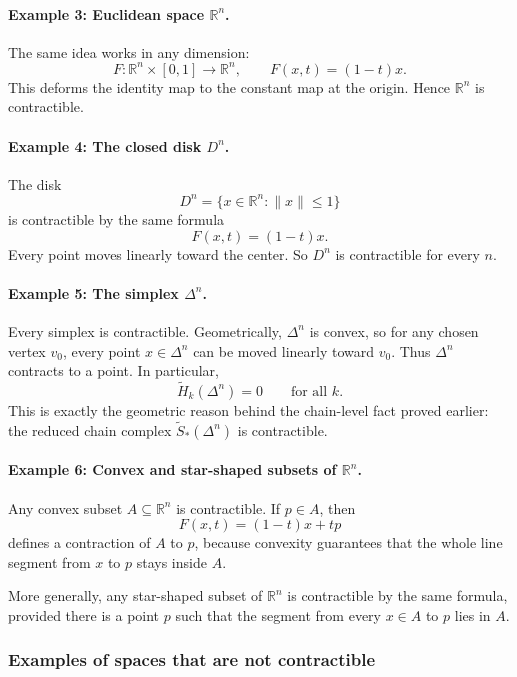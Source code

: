\documentclass[12pt,a4paper]{article}
\theoremstyle{notespace}
\begin{document}
\paragraph{Example 3: Euclidean space \(\mathbb{R}^n\).}
The same idea works in any dimension:
\[
F:\mathbb{R}^n\times [0,1]\to \mathbb{R}^n, \qquad F(x,t)=(1-t)x.
\]
This deforms the identity map to the constant map at the origin. Hence \(\mathbb{R}^n\) is contractible.

\paragraph{Example 4: The closed disk \(D^n\).}
The disk
\[
D^n=\{x\in \mathbb{R}^n : \|x\|\le 1\}
\]
is contractible by the same formula
\[
F(x,t)=(1-t)x.
\]
Every point moves linearly toward the center. So \(D^n\) is contractible for every \(n\).

\paragraph{Example 5: The simplex \(\Delta^n\).}
Every simplex is contractible. Geometrically, \(\Delta^n\) is convex, so for any chosen vertex \(v_0\), every point \(x\in \Delta^n\) can be moved linearly toward \(v_0\). Thus \(\Delta^n\) contracts to a point. In particular,
\[
\widetilde{H}_k(\Delta^n)=0 \qquad \text{for all } k.
\]
This is exactly the geometric reason behind the chain-level fact proved earlier: the reduced chain complex \(\widetilde{S}_*(\Delta^n)\) is contractible.

\paragraph{Example 6: Convex and star-shaped subsets of \(\mathbb{R}^n\).}
Any convex subset \(A\subseteq \mathbb{R}^n\) is contractible. If \(p\in A\), then
\[
F(x,t)=(1-t)x+tp
\]
defines a contraction of \(A\) to \(p\), because convexity guarantees that the whole line segment from \(x\) to \(p\) stays inside \(A\).

More generally, any star-shaped subset of \(\mathbb{R}^n\) is contractible by the same formula, provided there is a point \(p\) such that the segment from every \(x\in A\) to \(p\) lies in \(A\).

\subsubsection{Examples of spaces that are not contractible}
\end{document}
